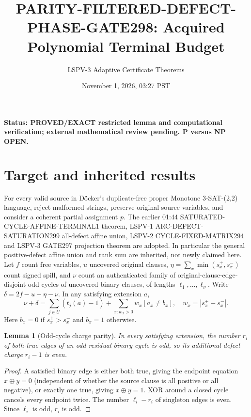 \documentclass[11pt]{article}
\title{PARITY-FILTERED-DEFECT-PHASE-GATE298: Acquired Polynomial Terminal Budget}
\author{LSPV-3 Adaptive Certificate Theorems}
\date{November 1, 2026, 03:27 PST}
\newtheorem{lemma}{Lemma}
\begin{document}
\maketitle
\noindent\textbf{Status: PROVED/EXACT restricted lemma and computational verification; external mathematical review pending. P versus NP OPEN.}
\section{Target and inherited results}
For every valid source in D\"ocker's duplicate-free proper Monotone 3-SAT-(2,2) language, reject malformed strings, preserve original source variables, and consider a coherent partial assignment $p$. The earlier 01:44 SATURATED-CYCLE-AFFINE-TERMINAL1 theorem, LSPV-1 ARC-DEFECT-SATURATION299 all-defect affine union, LSPV-2 CYCLE-FIXED-MATRIX294 and LSPV-3 GATE297 projection theorem are adopted. In particular the general positive-defect affine union and rank sum are inherited, not newly claimed here.
Let $f$ count free variables, $u$ uncovered original clauses, $\eta=\sum_x\min(s_x^+,s_x^-)$ count signed spill, and $\nu$ count an authenticated family of original-clause-edge-disjoint odd cycles of uncovered binary clauses, of lengths $\ell_1,\ldots,\ell_\nu$. Write $\delta=2f-u-\eta-\nu$. In any satisfying extension $a$,
\[
\nu+\delta=\sum_{j\in U}(t_j(a)-1)+
\sum_{x:w_x>0}w_x[a_x\ne b_x],\quad
w_x=|s_x^+-s_x^-|.
\]
Here $b_x=0$ if $s_x^+>s_x^-$ and $b_x=1$ otherwise.
\begin{lemma}[Odd-cycle charge parity]
In every satisfying extension, the number $r_i$ of both-true edges of an odd residual binary cycle is odd, so its additional defect charge $r_i-1$ is even.
\end{lemma}
\begin{proof}
A satisfied binary edge is either both true, giving the endpoint equation $x\oplus y=0$ (independent of whether the source clause is all positive or all negative), or exactly one true, giving $x\oplus y=1$. XOR around a closed cycle cancels every endpoint twice. The number $\ell_i-r_i$ of singleton edges is even. Since $\ell_i$ is odd, $r_i$ is odd.
\end{proof}
\end{document}
